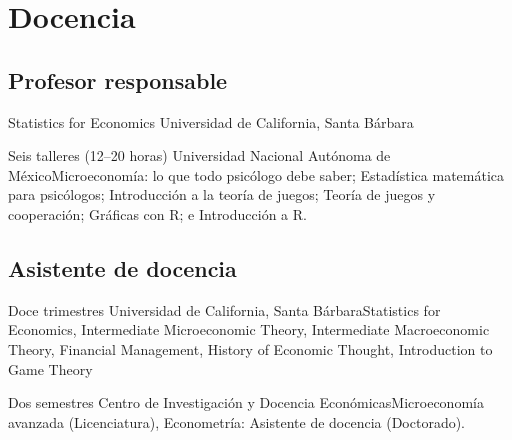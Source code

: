 \section{Docencia}

\subsection{Profesor responsable}

{Statistics for Economics}
{Universidad de California, Santa Bárbara}{}{}{}

{Seis talleres (12–20 horas)}
{Universidad Nacional Autónoma de México}{}{}{Microeconomía: lo que todo psicólogo debe saber; Estadística matemática para psicólogos; Introducción a la teoría de juegos; Teoría de juegos y cooperación; Gráficas con R; e Introducción a R.}


\subsection{Asistente de docencia}

{Doce trimestres}
{Universidad de California, Santa Bárbara}{}{}{Statistics for Economics, Intermediate Microeconomic Theory, Intermediate Macroeconomic Theory, Financial Management, History of Economic Thought, Introduction to Game Theory}

{Dos semestres}
{Centro de Investigación y Docencia Económicas}{}{}{Microeconomía avanzada (Licenciatura), Econometría: Asistente de docencia (Doctorado).}

